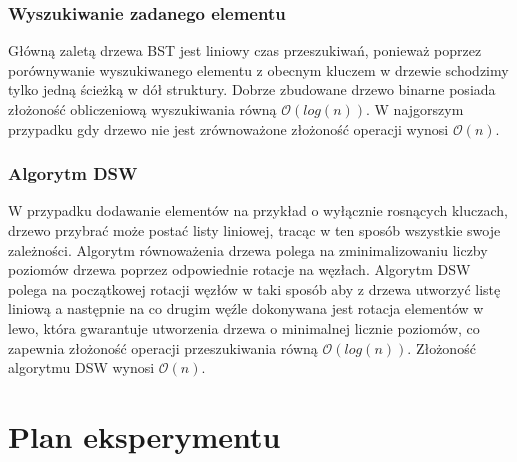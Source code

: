 \documentclass{article}
\begin{document}
\subsubsection{Wyszukiwanie zadanego elementu}

Główną zaletą drzewa BST jest liniowy czas przeszukiwań, ponieważ poprzez porównywanie wyszukiwanego elementu z obecnym kluczem w drzewie schodzimy tylko jedną ścieżką w dół struktury. Dobrze zbudowane drzewo binarne posiada złożoność obliczeniową wyszukiwania równą $\mathcal{O}(log(n))$. W najgorszym przypadku gdy drzewo nie jest zrównoważone złożoność operacji wynosi $\mathcal{O}(n)$.

\subsubsection{Algorytm DSW}

W przypadku dodawanie elementów na przykład o wyłącznie rosnących kluczach, drzewo przybrać może postać listy liniowej, tracąc w ten sposób wszystkie swoje zależności. Algorytm równoważenia drzewa polega na zminimalizowaniu liczby poziomów drzewa poprzez odpowiednie rotacje na węzłach. Algorytm DSW polega na początkowej rotacji węzłów w taki sposób aby z drzewa utworzyć listę liniową a następnie na co drugim węźle dokonywana jest rotacja elementów w lewo, która gwarantuje utworzenia drzewa o minimalnej licznie poziomów, co zapewnia złożoność operacji przeszukiwania równą $\mathcal{O}(log(n))$. Złożoność algorytmu DSW wynosi $\mathcal{O}(n)$.


\section{Plan eksperymentu}
\end{document}
